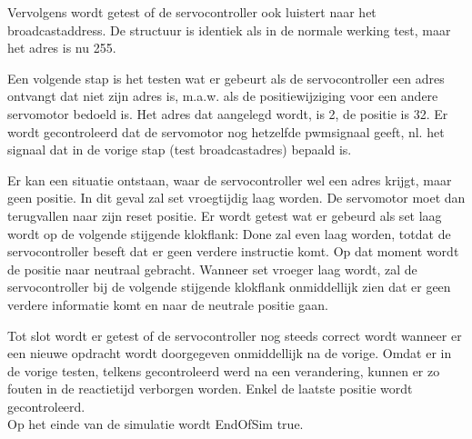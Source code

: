 
Vervolgens wordt getest of de servocontroller ook luistert naar het broadcastaddress. De structuur is identiek als in de normale werking test, maar het adres is nu 255.


Een volgende stap is het testen wat er gebeurt als de servocontroller een adres ontvangt dat niet zijn adres is, m.a.w. als de positiewijziging voor een andere servomotor bedoeld is. Het adres dat aangelegd wordt, is 2, de positie is 32\textdegree. Er wordt gecontroleerd dat de servomotor nog hetzelfde \gls{pwm}signaal geeft, nl. het signaal dat in de vorige stap (test broadcastadres) bepaald is.


Er kan een situatie ontstaan, waar de servocontroller wel een adres krijgt, maar geen positie. In dit geval zal set vroegtijdig laag worden. De servomotor moet dan terugvallen naar zijn reset positie. Er wordt getest wat er gebeurd als set laag wordt op de volgende stijgende klokflank: Done zal even laag worden, totdat de servocontroller beseft dat er geen verdere instructie komt. Op dat moment wordt de positie naar neutraal gebracht. Wanneer set vroeger laag wordt, zal de servocontroller bij de volgende stijgende klokflank onmiddellijk zien dat er geen verdere informatie komt en naar de neutrale positie gaan.


Tot slot wordt er getest of de servocontroller nog steeds correct wordt wanneer er een nieuwe opdracht wordt doorgegeven onmiddellijk na de vorige. Omdat er in de vorige testen, telkens gecontroleerd werd na een verandering, kunnen er zo fouten in de reactietijd verborgen worden. Enkel de laatste positie wordt gecontroleerd.\\
\noindent
Op het einde van de simulatie wordt EndOfSim true.

